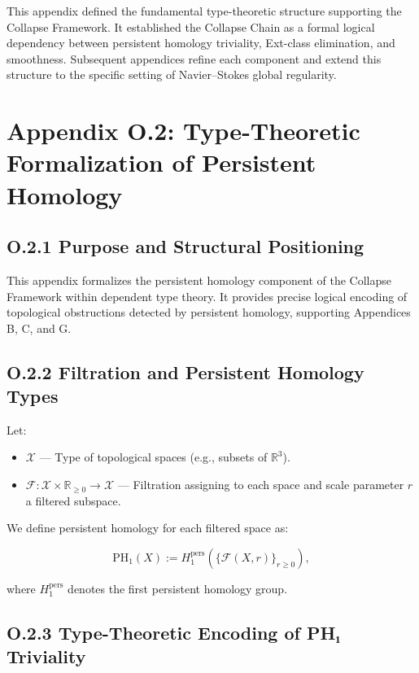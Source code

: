\documentclass[11pt]{article}
\begin{document}
This appendix defined the fundamental type-theoretic structure supporting the Collapse Framework.  
It established the Collapse Chain as a formal logical dependency between persistent homology triviality, Ext-class elimination, and smoothness.  
Subsequent appendices refine each component and extend this structure to the specific setting of Navier–Stokes global regularity.



\section*{Appendix O.2: Type-Theoretic Formalization of Persistent Homology}

\subsection*{O.2.1 Purpose and Structural Positioning}

This appendix formalizes the persistent homology component of the Collapse Framework within dependent type theory.  
It provides precise logical encoding of topological obstructions detected by persistent homology, supporting Appendices B, C, and G.

\subsection*{O.2.2 Filtration and Persistent Homology Types}

Let:

\begin{itemize}
  \item \( \mathcal{X} \) — Type of topological spaces (e.g., subsets of \( \mathbb{R}^3 \)).
  \item \( \mathcal{F} : \mathcal{X} \times \mathbb{R}_{\geq 0} \to \mathcal{X} \) — Filtration assigning to each space and scale parameter \( r \) a filtered subspace.
\end{itemize}

We define persistent homology for each filtered space as:

\[
\mathrm{PH}_1(X) := H_1^{\mathrm{pers}}\left( \{ \mathcal{F}(X, r) \}_{r \geq 0} \right),
\]

where \( H_1^{\mathrm{pers}} \) denotes the first persistent homology group.

\subsection*{O.2.3 Type-Theoretic Encoding of PH₁ Triviality}
\end{document}
